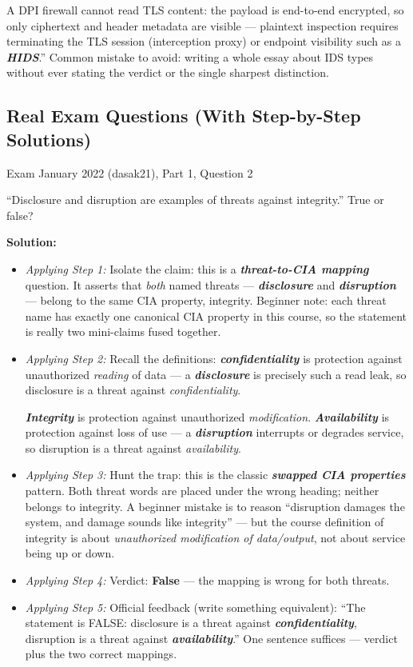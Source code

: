 \documentclass[12pt, a4paper]{article}
\newcommand{\term}[1]{\textbf{\textit{#1}}}        %
\begin{document}
\begin{itemize}
    A DPI firewall cannot read TLS content: the payload is end-to-end encrypted, so only ciphertext and header metadata are visible --- plaintext inspection requires terminating the TLS session (interception proxy) or endpoint visibility such as a \term{HIDS}.'' Common mistake to avoid: writing a whole essay about IDS types without ever stating the verdict or the single sharpest distinction.
\end{itemize}

\subsection*{Real Exam Questions (With Step-by-Step Solutions)}

\begin{practicebox}{Exam January 2022 (dasak21), Part 1, Question 2}
\begin{problembox}
``Disclosure and disruption are examples of threats against integrity.'' True or false?
\end{problembox}

\textbf{Solution:}
\begin{itemize}
    \item \textit{Applying Step 1:} Isolate the claim: this is a \term{threat-to-CIA mapping} question. It asserts that \emph{both} named threats --- \term{disclosure} and \term{disruption} --- belong to the same CIA property, integrity.
    Beginner note: each threat name has exactly one canonical CIA property in this course, so the statement is really two mini-claims fused together.
    \item \textit{Applying Step 2:} Recall the definitions: \term{confidentiality} is protection against unauthorized \emph{reading} of data --- a \term{disclosure} is precisely such a read leak, so disclosure is a threat against \emph{confidentiality}.

    \term{Integrity} is protection against unauthorized \emph{modification}. \term{Availability} is protection against loss of use --- a \term{disruption} interrupts or degrades service, so disruption is a threat against \emph{availability}.
    \item \textit{Applying Step 3:} Hunt the trap: this is the classic \term{swapped CIA properties} pattern. Both threat words are placed under the wrong heading; neither belongs to integrity.
    A beginner mistake is to reason ``disruption damages the system, and damage sounds like integrity'' --- but the course definition of integrity is about \emph{unauthorized modification of data/output}, not about service being up or down.
    \item \textit{Applying Step 4:} Verdict: \textbf{False} --- the mapping is wrong for both threats.
    \item \textit{Applying Step 5:} Official feedback (write something equivalent): ``The statement is FALSE: disclosure is a threat against \term{confidentiality}, disruption is a threat against \term{availability}.'' One sentence suffices --- verdict plus the two correct mappings.
\end{itemize}


\end{practicebox}
\end{document}
